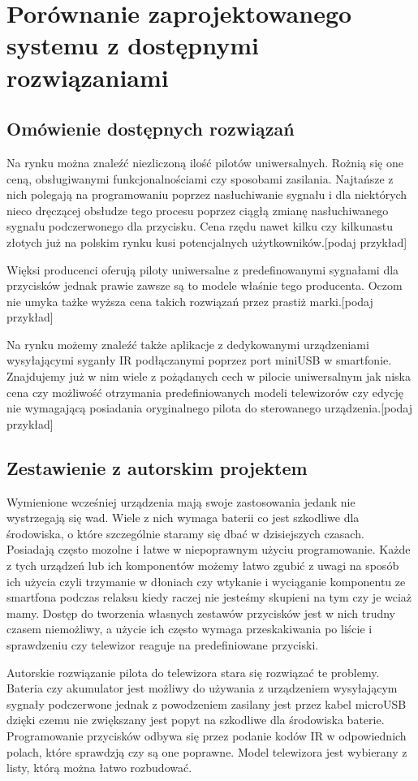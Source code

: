 \documentclass[12pt,twoside]{article}
\begin{document}
\clearpage
\section{Porównanie zaprojektowanego systemu z dostępnymi rozwiązaniami}
\subsection{Omówienie dostępnych rozwiązań}
{Na rynku można znaleźć niezliczoną ilość pilotów uniwersalnych. Rożnią się one 
ceną, obsługiwanymi funkcjonalnościami czy sposobami zasilania. Najtańsze z nich polegają
na programowaniu poprzez nasłuchiwanie sygnału i dla niektórych nieco dręczącej obsłudze tego
procesu poprzez ciągłą zmianę nasłuchiwanego sygnału podczerwonego dla przycisku. Cena rzędu
nawet kilku czy kilkunastu złotych już na polskim rynku kusi potencjalnych użytkowników.[podaj przykład] 

Więksi producenci oferują piloty uniwersalne z predefinowanymi sygnałami dla przycisków jednak
prawie zawsze są to modele właśnie tego producenta. Oczom nie umyka tażke wyższa cena takich
rozwiązań przez prastiż marki.[podaj przykład]

Na rynku możemy znaleźć także aplikacje z dedykowanymi urządzeniami wysyłającymi syganły IR
podłączanymi poprzez port miniUSB w smartfonie. Znajdujemy już w nim wiele z pożądanych cech w pilocie
 uniwersalnym jak niska cena czy możliwość otrzymania predefiniowanych modeli telewizorów 
 czy edycję nie wymagającą posiadania oryginalnego pilota do sterowanego urządzenia.[podaj przykład]}
\subsection{Zestawienie z autorskim projektem}
{Wymienione wcześniej urządzenia mają swoje zastosowania jedank nie wystrzegają się wad. Wiele z nich 
 wymaga baterii co jest szkodliwe dla środowiska, o które szczególnie staramy się dbać
w dzisiejszych czasach. Posiadają często mozolne i łatwe w niepoprawnym użyciu programowanie. Każde z 
tych urządzeń lub ich komponentów możemy łatwo zgubić z uwagi na sposób ich użycia czyli trzymanie w 
dłoniach czy wtykanie i wyciąganie komponentu ze smartfona podczas relaksu kiedy raczej nie jesteśmy skupieni na tym
czy je wciaż mamy. Dostęp do tworzenia własnych zestawów przycisków jest w nich trudny czasem niemożliwy, 
a użycie ich często wymaga przeskakiwania po liście i sprawdzeniu czy telewizor reaguje na predefiniowane przyciski.

Autorskie rozwiązanie pilota do telewizora stara się rozwiązać te problemy. Bateria czy akumulator jest 
możliwy do używania z urządzeniem wysyłającym sygnały podczerwone jednak z powodzeniem zasilany jest przez 
kabel microUSB dzięki czemu nie zwiększany jest popyt na szkodliwe dla środowiska baterie. Programowanie przycisków
odbywa się przez podanie kodów IR w odpowiednich polach, które sprawdzją czy są one poprawne. Model telewizora jest 
wybierany z listy, którą można łatwo rozbudować.
}
\clearpage
\end{document}
